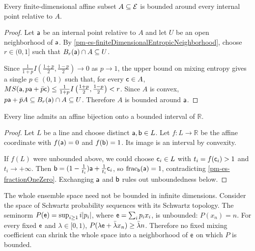 \begin{mathSection}
	\begin{prop}\label{pm-es-finiteDimensionalAffineBoundedness}
		Every finite-dimensional affine subset $A \subseteq \Ens$ is bounded around every internal point relative to $A$.
	\end{prop}
	
	\begin{proof}
		Let $\ens[a]$ be an internal point relative to $A$ and let $U$ be an open neighborhood of $\ens[a]$. By \ref{pm-es-finiteDimensionalEntropicNeighborhood}, choose $r \in (0,1]$ such that $B_r(\ens[a])\cap A \subseteq U$.
		
		Since $\frac{1}{1+p}I\left(\frac{1+p}{2},\frac{1-p}{2}\right)\to0$ as $p\to1$, the upper bound on mixing entropy gives a single $p \in (0,1)$ such that, for every $\ens[c] \in A$, $MS(\ens[a],p\ens[a]+\bar{p}\ens[c]) \leq \frac{1}{1+p}I\left(\frac{1+p}{2},\frac{1-p}{2}\right) < r$.
		Since $A$ is convex, $p\ens[a]+\bar{p}A \subseteq B_r(\ens[a])\cap A \subseteq U$. Therefore $A$ is bounded around $\ens[a]$.
	\end{proof}

	\begin{coro}
		Every line admits an affine bijection onto a bounded interval of $\mathbb{R}$.
	\end{coro}

	\begin{proof}
		Let $L$ be a line and choose distinct $\ens[a],\ens[b] \in L$. Let $f:L\to\mathbb{R}$ be the affine coordinate with $f(\ens[a])=0$ and $f(\ens[b])=1$. Its image is an interval by convexity.

		If $f(L)$ were unbounded above, we could choose $\ens[c]_i \in L$ with $t_i=f(\ens[c]_i)>1$ and $t_i\to+\infty$. Then $\ens[b]=(1-\frac{1}{t_i})\ens[a]+\frac{1}{t_i}\ens[c]_i$, so $\fraction_{\ens[b]}(\ens[a])=1$, contradicting \ref{pm-es-fractionOneZero}. Exchanging $\ens[a]$ and $\ens[b]$ rules out unboundedness below.
	\end{proof}
\end{mathSection}

The whole ensemble space need not be bounded in infinite dimensions. Consider the space of Schwartz probability sequences with its Schwartz topology. The seminorm $P(\ens)=\sup_{i\geq1}i|p_i|$, where $\ens=\sum_i p_i x_i$, is unbounded: $P(x_n)=n$. For every fixed $\ens$ and $\lambda\in[0,1)$, $P(\lambda\ens+\bar{\lambda}x_n)\geq\bar{\lambda}n$. Therefore no fixed mixing coefficient can shrink the whole space into a neighborhood of $\ens$ on which $P$ is bounded.

